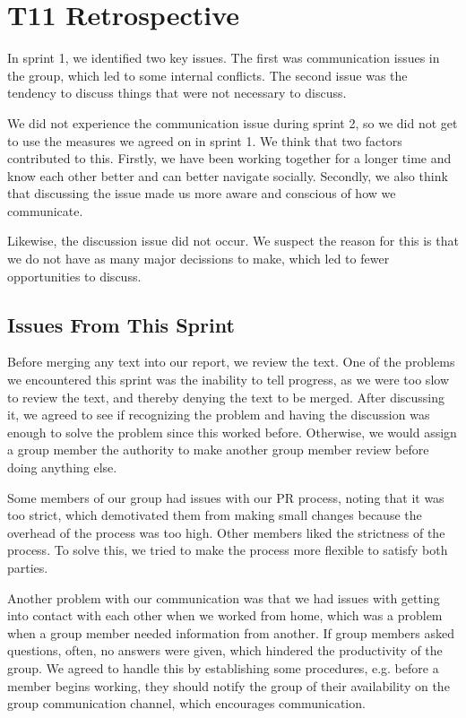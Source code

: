 \section{T11 Retrospective} \label{s2Retrospective}

In sprint 1, we identified two key issues. The first was communication issues in the group, which led to some internal conflicts. The second issue was the tendency to discuss things that were not necessary to discuss.

We did not experience the communication issue during sprint 2, so we did not get to use the measures we agreed on in sprint 1. We think that two factors contributed to this. Firstly, we have been working together for a longer time and know each other better and can better navigate socially. Secondly, we also think that discussing the issue made us more aware and conscious of how we communicate. 

Likewise, the discussion issue did not occur. We suspect the reason for this is that we do not have as many major decissions to make, which led to fewer opportunities to discuss.

\subsection{Issues From This Sprint}

Before merging any text into our report, we review the text. One of the problems we encountered this sprint was the inability to tell progress, as we were too slow to review the text, and thereby denying the text to be merged. After discussing it, we agreed to see if recognizing the problem and having the discussion was enough to solve the problem since this worked before. Otherwise, we would assign a group member the authority to make another group member review before doing anything else. 

Some members of our group had issues with our \gls{PR} process, noting that it was too strict, which demotivated them from making small changes because the overhead of the process was too high. Other members liked the strictness of the process. To solve this, we tried to make the process more flexible to satisfy both parties.

Another problem with our communication was that we had issues with getting into contact with each other when we worked from home, which was a problem when a group member needed information from another. If group members asked questions, often, no answers were given, which hindered the productivity of the group. We agreed to handle this by establishing some procedures, e.g. before a member begins working, they should notify the group of their availability on the group communication channel, which encourages communication.

